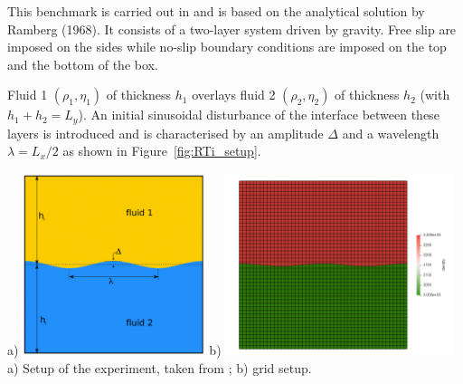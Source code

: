
This benchmark is carried out in \cite{deka08,gery10,thie11} and is 
based on the analytical solution by Ramberg (1968). 
It consists of a two-layer system driven by gravity. 
Free slip are imposed on the sides while no-slip boundary conditions are imposed on the
top and the bottom of the box.

Fluid 1 $(\rho_1,\eta_1)$ of thickness $h_1$ overlays 
fluid 2 $(\rho_2,\eta_2)$ of thickness $h_2$ (with $h_1+h_2=L_y$).
An initial sinusoidal disturbance of the interface between these
layers is introduced and is characterised by an amplitude $\Delta$ and a
wavelength $\lambda=L_x/2$ as shown in Figure~\ref{fig:RTi_setup}.

\begin{center}
a) \includegraphics[width=0.4\textwidth]{python_codes/fieldstone_40/images/setup}
b) \includegraphics[width=0.5\textwidth]{python_codes/fieldstone_40/images/grid}\\
{\small  a) Setup of the experiment, taken from \cite{thie11}; b) grid setup.} 
\end{center}


